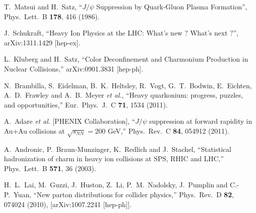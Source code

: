 \documentclass[aps,prc,preprint,superscriptaddress,showpacs,showkeys,amsmath]{revtex4-1}
\begin{document}
\noindent
\begin{thebibliography}{100}
\medskip

 T.~Matsui and H.~Satz,
 ``$J/\psi$ Suppression by Quark-Gluon Plasma Formation'',
 Phys.\ Lett.\ B {\bf 178}, 416 (1986).

  J.~Schukraft,
  ``Heavy Ion Physics at the LHC: What's new ? What's next ?'',
  arXiv:1311.1429 [hep-ex].


  L.~Kluberg and H.~Satz,
  ``Color Deconfinement and Charmonium Production in Nuclear Collisions,''
  arXiv:0901.3831 [hep-ph].

  N.~Brambilla, S.~Eidelman, B.~K.~Heltsley, R.~Vogt, G.~T.~Bodwin, E.~Eichten, A.~D.~Frawley and A.~B.~Meyer {\it et al.},
  ``Heavy quarkonium: progress, puzzles, and opportunities,''
  Eur.\ Phys.\ J.\ C {\bf 71}, 1534 (2011).

  A.~Adare {\it et al.}  [PHENIX Collaboration],
  ``$J/\psi$ suppression at forward rapidity in Au+Au collisions at $\sqrt{s_{NN}}=200$ GeV,''
  Phys.\ Rev.\ C {\bf 84}, 054912 (2011).

  A.~Andronic, P.~Braun-Munzinger, K.~Redlich and J.~Stachel,
  ``Statistical hadronization of charm in heavy ion collisions at SPS, RHIC and LHC,''
  Phys.\ Lett.\ B {\bf 571}, 36 (2003).



  H.~L.~Lai, M.~Guzzi, J.~Huston, Z.~Li, P.~M.~Nadolsky, J.~Pumplin and C.-P.~Yuan,
  ``New parton distributions for collider physics,''
  Phys.\ Rev.\ D {\bf 82}, 074024 (2010),
  [arXiv:1007.2241 [hep-ph]].

  



\end{thebibliography}
\end{document}

